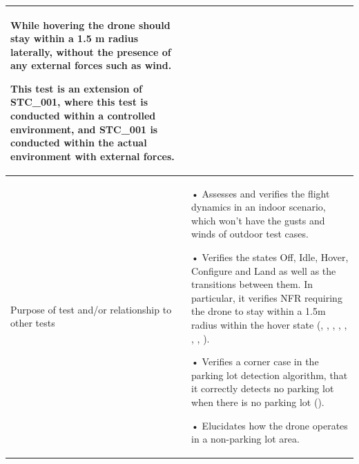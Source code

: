 \documentclass[12pt, titlepage]{article}
\begin{document}
\begin{table}[!h]
\begin{center}
\begin{tabular}{ | m{1.5cm} | m{15cm} | }
While hovering the drone should stay within a 1.5 m radius laterally, without the presence of any external forces such as wind.

This test is an extension of STC_001, where this test is conducted within a controlled environment, and STC_001 is conducted within the actual environment with external forces. \\ 
\hline
Purpose of test and/or relationship to other tests &  • Assesses and verifies the flight dynamics in an indoor scenario, which won't have the gusts and winds of outdoor test cases.

• Verifies the states Off, Idle, Hover, Configure and Land as well as the transitions between them. In particular, it verifies NFR requiring the drone to stay within a 1.5m radius within the hover state (\nameref{STA_000}, \nameref{STA_001}, \nameref{STA_004}, \nameref{STA_005}, \nameref{STA_006}, \nameref{TRANS_002}, \nameref{TRANS_003}, \nameref{TRANS_009}).

• Verifies a corner case in the parking lot detection algorithm, that it correctly detects no parking lot when there is no parking lot (\nameref{GEN_001}).

• Elucidates how the drone operates in a non-parking lot area.
\\ 
\hline
\end{tabular}
\end{center}
\end{table}
\end{document}

